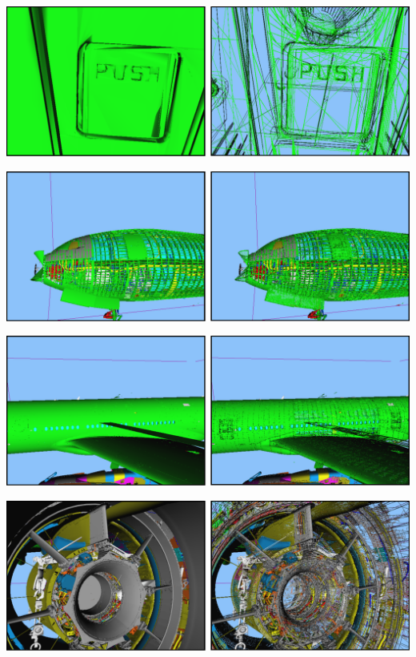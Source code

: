 \begin{Bild}
\includegraphics[scale=0.40]{images/button.pdf}
\end{Bild}

\begin{Bild}
\includegraphics[scale=0.40]{images/profil_bug.pdf}
\end{Bild}

\begin{Bild}
\includegraphics[scale=0.40]{images/profil_heck.pdf}
\end{Bild}

\begin{Bild}
\includegraphics[scale=0.40]{images/turbine_innen.pdf}
\end{Bild}

